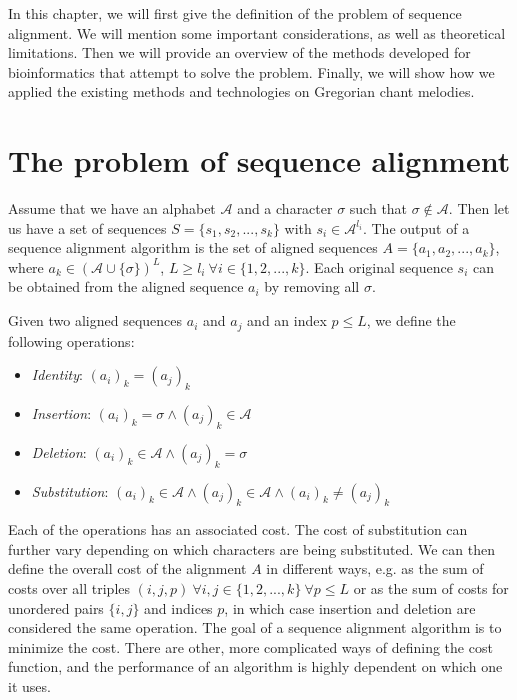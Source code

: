 In this chapter, we will first give the definition of the problem of sequence alignment. We will mention some important considerations,
as well as theoretical limitations. Then we will provide an overview of the methods developed for bioinformatics that attempt to solve
the problem. Finally, we will show how we applied the existing methods and technologies on Gregorian chant melodies.

\section{The problem of sequence alignment}

Assume that we have an alphabet $\mathcal{A}$ and a character $\sigma$ such that $\sigma \notin \mathcal{A}$. Then let us have a set
of sequences $S = \{s_1, s_2, ..., s_k\}$ with $s_i \in \mathcal{A}^{l_i}$. The output of a sequence alignment algorithm is the set of
aligned sequences $A = \{a_1, a_2, ..., a_k\}$, where $a_k \in (\mathcal{A}\cup\{\sigma\})^L$, $L \geq l_i \:\forall i\in\{1, 2, ..., k\}$.
Each original sequence $s_i$ can be obtained from the aligned sequence $a_i$ by removing all $\sigma$.

Given two aligned sequences $a_i$ and $a_j$ and an index $p \leq L$, we define the following operations:

\begin{itemize}
    \item \emph{Identity}: $(a_i)_k = (a_j)_k$
    \item \emph{Insertion}: $(a_i)_k = \sigma \land (a_j)_k \in \mathcal{A}$
    \item \emph{Deletion}: $(a_i)_k \in \mathcal{A} \land (a_j)_k = \sigma$
    \item \emph{Substitution}: $(a_i)_k \in \mathcal{A} \land (a_j)_k \in \mathcal{A} \land (a_i)_k \neq (a_j)_k$
\end{itemize}

Each of the operations has an associated cost. The cost of substitution can further vary depending on which characters are being
substituted. We can then define the overall cost of the alignment $A$ in different ways, e.g. as the sum of costs over all triples
$(i, j, p) \: \forall i, j \in \{1, 2, ..., k\} \: \forall p \leq L$ or as the sum of costs for unordered pairs $\{i, j\}$ and indices $p$,
in which case insertion and deletion are considered the same operation. The goal of a sequence alignment algorithm is to minimize the cost.
There are other, more complicated ways of defining the cost  function, and the performance of an algorithm is highly dependent on which one it uses.

